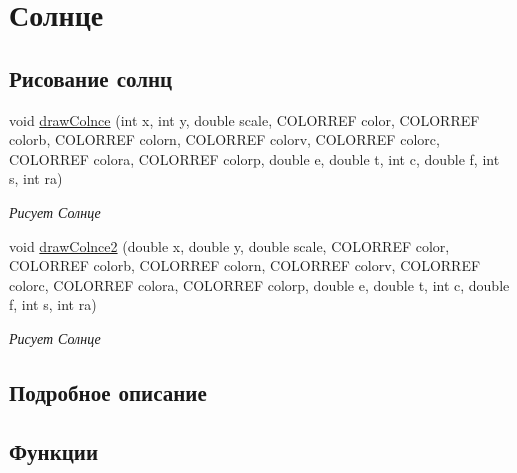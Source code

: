 \hypertarget{group___xD0_xA1_xD0_xBE_xD0_xBB_xD0_xBD_xD1_x86_xD0_xB5}{}\section{Солнце}
\label{group___xD0_xA1_xD0_xBE_xD0_xBB_xD0_xBD_xD1_x86_xD0_xB5}
\subsection*{Рисование солнц}
\begin{DoxyCompactItemize}
\item 
void \hyperlink{group___xD0_xA1_xD0_xBE_xD0_xBB_xD0_xBD_xD1_x86_xD0_xB5_ga9d6bda313295321b4a725a992ce45a5c}{draw\+Colnce} (int x, int y, double scale, C\+O\+L\+O\+R\+R\+EF color, C\+O\+L\+O\+R\+R\+EF colorb, C\+O\+L\+O\+R\+R\+EF colorn, C\+O\+L\+O\+R\+R\+EF colorv, C\+O\+L\+O\+R\+R\+EF colorc, C\+O\+L\+O\+R\+R\+EF colora, C\+O\+L\+O\+R\+R\+EF colorp, double e, double t, int c, double f, int s, int ra)
\begin{DoxyCompactList}\small\item\em Рисует Солнце \end{DoxyCompactList}\item 
void \hyperlink{group___xD0_xA1_xD0_xBE_xD0_xBB_xD0_xBD_xD1_x86_xD0_xB5_ga928a7fd4be90db87214df29431c2670b}{draw\+Colnce2} (double x, double y, double scale, C\+O\+L\+O\+R\+R\+EF color, C\+O\+L\+O\+R\+R\+EF colorb, C\+O\+L\+O\+R\+R\+EF colorn, C\+O\+L\+O\+R\+R\+EF colorv, C\+O\+L\+O\+R\+R\+EF colorc, C\+O\+L\+O\+R\+R\+EF colora, C\+O\+L\+O\+R\+R\+EF colorp, double e, double t, int c, double f, int s, int ra)
\begin{DoxyCompactList}\small\item\em Рисует Солнце \end{DoxyCompactList}\end{DoxyCompactItemize}


\subsection{Подробное описание}


\subsection{Функции}
\hypertarget{group___xD0_xA1_xD0_xBE_xD0_xBB_xD0_xBD_xD1_x86_xD0_xB5_ga9d6bda313295321b4a725a992ce45a5c}{}\label{group___xD0_xA1_xD0_xBE_xD0_xBB_xD0_xBD_xD1_x86_xD0_xB5_ga9d6bda313295321b4a725a992ce45a5c} 
